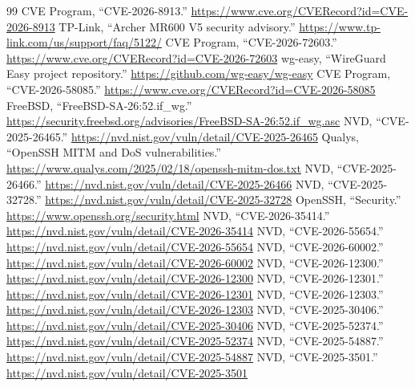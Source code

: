 \documentclass[11pt,a4paper]{article}
\begin{document}
\begin{thebibliography}{99}
 CVE Program, ``CVE-2026-8913.'' \url{https://www.cve.org/CVERecord?id=CVE-2026-8913}
 TP-Link, ``Archer MR600 V5 security advisory.'' \url{https://www.tp-link.com/us/support/faq/5122/}
 CVE Program, ``CVE-2026-72603.'' \url{https://www.cve.org/CVERecord?id=CVE-2026-72603}
 wg-easy, ``WireGuard Easy project repository.'' \url{https://github.com/wg-easy/wg-easy}
 CVE Program, ``CVE-2026-58085.'' \url{https://www.cve.org/CVERecord?id=CVE-2026-58085}
 FreeBSD, ``FreeBSD-SA-26:52.if\_wg.'' \url{https://security.freebsd.org/advisories/FreeBSD-SA-26:52.if_wg.asc}
 NVD, ``CVE-2025-26465.'' \url{https://nvd.nist.gov/vuln/detail/CVE-2025-26465}
 Qualys, ``OpenSSH MITM and DoS vulnerabilities.'' \url{https://www.qualys.com/2025/02/18/openssh-mitm-dos.txt}
 NVD, ``CVE-2025-26466.'' \url{https://nvd.nist.gov/vuln/detail/CVE-2025-26466}
 NVD, ``CVE-2025-32728.'' \url{https://nvd.nist.gov/vuln/detail/CVE-2025-32728}
 OpenSSH, ``Security.'' \url{https://www.openssh.org/security.html}
 NVD, ``CVE-2026-35414.'' \url{https://nvd.nist.gov/vuln/detail/CVE-2026-35414}
 NVD, ``CVE-2026-55654.'' \url{https://nvd.nist.gov/vuln/detail/CVE-2026-55654}
 NVD, ``CVE-2026-60002.'' \url{https://nvd.nist.gov/vuln/detail/CVE-2026-60002}
 NVD, ``CVE-2026-12300.'' \url{https://nvd.nist.gov/vuln/detail/CVE-2026-12300}
 NVD, ``CVE-2026-12301.'' \url{https://nvd.nist.gov/vuln/detail/CVE-2026-12301}
 NVD, ``CVE-2026-12303.'' \url{https://nvd.nist.gov/vuln/detail/CVE-2026-12303}
 NVD, ``CVE-2025-30406.'' \url{https://nvd.nist.gov/vuln/detail/CVE-2025-30406}
 NVD, ``CVE-2025-52374.'' \url{https://nvd.nist.gov/vuln/detail/CVE-2025-52374}
 NVD, ``CVE-2025-54887.'' \url{https://nvd.nist.gov/vuln/detail/CVE-2025-54887}
 NVD, ``CVE-2025-3501.'' \url{https://nvd.nist.gov/vuln/detail/CVE-2025-3501}
\end{thebibliography}
\end{document}
